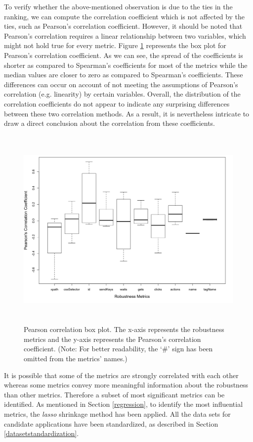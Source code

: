 To verify whether the above-mentioned observation is due to the ties in the ranking, we can compute the correlation coefficient which is not affected by the ties, such as Pearson's correlation coefficient. However, it should be noted that Pearson's correlation requires a linear relationship between two variables, which might not hold true for every metric. Figure \ref{fig:pearson} represents the box plot for Pearson's correlation coefficient. As we can see, the spread of the coefficients is shorter as compared to Spearman's coefficients for most of the metrics while the median values are closer to zero as compared to Spearman's coefficients. These differences can occur on account of not meeting the assumptions of Pearson's correlation (e.g. linearity) by certain variables. Overall, the distribution of the correlation coefficients do not appear to indicate any surprising differences between these two correlation methods. As a result, it is nevertheless intricate to draw a direct conclusion about the correlation from these coefficients. 

\begin{figure}[ht!] 
\centering     %
\includegraphics[width=15cm,height=10cm]{./Figures/pearson-rq2}
 \captionsetup{justification=justified,
singlelinecheck=false}
\caption{Pearson correlation box plot. The x-axis represents the robustness metrics and the y-axis represents the Pearson's correlation coefficient. (Note: For better readability, the `\#' sign has been omitted from the metrics' names.)}
\label{fig:pearson}
\end{figure}

It is possible that some of the metrics are strongly correlated with each other whereas some metrics convey more meaningful information about the robustness than other metrics. Therefore a subset of most significant metrics can be identified. As mentioned in Section \ref{regression}, to identify the most influential metrics, the \textit{lasso} shrinkage method has been applied. All the data sets for candidate applications have been standardized, as described in Section \ref{datasetstandardization}. 


